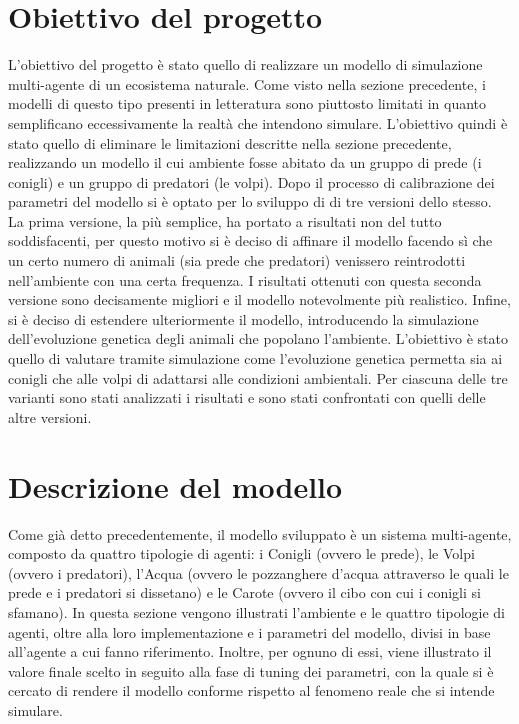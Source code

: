 \documentclass[11pt]{article}
\begin{document}
\section{Obiettivo del progetto}
L'obiettivo del progetto è stato quello di realizzare un modello di simulazione multi-agente di un ecosistema naturale. Come visto nella sezione precedente, i modelli di questo tipo presenti in letteratura sono piuttosto limitati in quanto semplificano eccessivamente la realtà che intendono simulare. L'obiettivo quindi è stato quello di eliminare le limitazioni descritte nella sezione precedente, realizzando un modello il cui ambiente fosse abitato da un gruppo di prede (i conigli) e un gruppo di predatori (le volpi). Dopo il processo di calibrazione dei parametri del modello si è optato per lo sviluppo di di tre versioni dello stesso. La prima versione, la più semplice, ha portato a risultati non del tutto soddisfacenti, per questo motivo si è deciso di affinare il modello facendo sì che un certo numero di animali (sia prede che predatori) venissero reintrodotti nell'ambiente con una certa frequenza. I risultati ottenuti con questa seconda versione sono decisamente migliori e il modello notevolmente più realistico. Infine, si è deciso di estendere ulteriormente il modello, introducendo la simulazione dell'evoluzione genetica degli animali che popolano l'ambiente. L'obiettivo è stato quello di valutare tramite simulazione come l'evoluzione genetica permetta sia ai conigli che alle volpi di adattarsi alle condizioni ambientali. Per ciascuna delle tre varianti sono stati analizzati i risultati e sono stati confrontati con quelli delle altre versioni. 

\section{Descrizione del modello}
Come già detto precedentemente, il modello sviluppato è un sistema multi-agente, composto da quattro tipologie di agenti: i Conigli (ovvero le prede), le Volpi (ovvero i predatori), l'Acqua (ovvero le pozzanghere d'acqua attraverso le quali le prede e i predatori si dissetano) e le Carote (ovvero il cibo con cui i conigli si sfamano). In questa sezione vengono illustrati l'ambiente e le quattro tipologie di agenti, oltre alla loro implementazione e i parametri del modello, divisi in base all'agente a cui fanno riferimento. Inoltre, per ognuno di essi, viene illustrato il valore finale scelto in seguito alla fase di tuning dei parametri, con la quale si è cercato di rendere il modello conforme rispetto al fenomeno reale che si intende simulare. 
\end{document}
